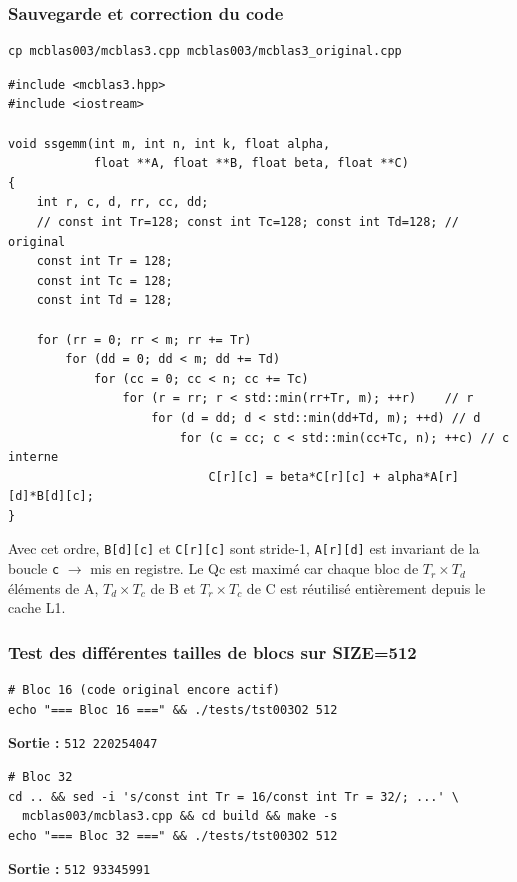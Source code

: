 \documentclass[a4paper,11pt]{article}
\newcommand{\code}[1]{\texttt{\color{CodeRed}#1}}
\begin{document}
\subsubsection{Sauvegarde et correction du code}

\begin{lstlisting}[style=bash]
cp mcblas003/mcblas3.cpp mcblas003/mcblas3_original.cpp
\end{lstlisting}

\begin{lstlisting}[style=cpp, caption={mcblas003 --- Nouveau code corrig\'e (ordre interne r\,$\to$\,d\,$\to$\,c)}]
#include <mcblas3.hpp>
#include <iostream>

void ssgemm(int m, int n, int k, float alpha,
            float **A, float **B, float beta, float **C)
{
    int r, c, d, rr, cc, dd;
    // const int Tr=128; const int Tc=128; const int Td=128; // original
    const int Tr = 128;
    const int Tc = 128;
    const int Td = 128;

    for (rr = 0; rr < m; rr += Tr)
        for (dd = 0; dd < m; dd += Td)
            for (cc = 0; cc < n; cc += Tc)
                for (r = rr; r < std::min(rr+Tr, m); ++r)    // r
                    for (d = dd; d < std::min(dd+Td, m); ++d) // d
                        for (c = cc; c < std::min(cc+Tc, n); ++c) // c interne
                            C[r][c] = beta*C[r][c] + alpha*A[r][d]*B[d][c];
}
\end{lstlisting}

Avec cet ordre, \code{B[d][c]} et \code{C[r][c]} sont stride-1, \code{A[r][d]} est
invariant de la boucle \code{c} $\to$ mis en registre. Le Qc est maxim\'e car chaque
bloc de $T_r \times T_d$ \'el\'ements de A, $T_d \times T_c$ de B et $T_r \times T_c$
de C est r\'eutilis\'e enti\`erement depuis le cache L1.

\subsubsection{Test des diff\'erentes tailles de blocs sur SIZE=512}

\begin{lstlisting}[style=bash]
# Bloc 16 (code original encore actif)
echo "=== Bloc 16 ===" && ./tests/tst003O2 512
\end{lstlisting}
\textbf{Sortie :} \code{512   220254047}

\begin{lstlisting}[style=bash]
# Bloc 32
cd .. && sed -i 's/const int Tr = 16/const int Tr = 32/; ...' \
  mcblas003/mcblas3.cpp && cd build && make -s
echo "=== Bloc 32 ===" && ./tests/tst003O2 512
\end{lstlisting}
\textbf{Sortie :} \code{512   93345991}
\end{document}
